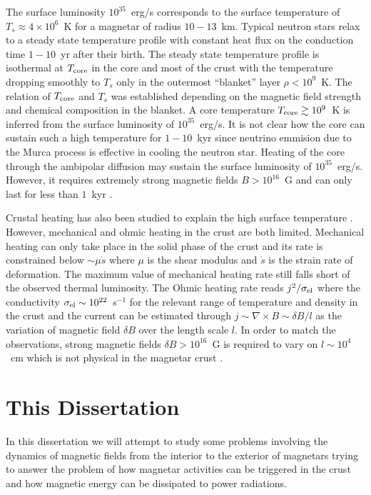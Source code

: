 The surface luminosity $10^{35}$~erg/s corresponds to the surface temperature of $T_s\approx 4\times 10^6$~K for a magnetar of radius $10-13$~km.
Typical neutron stars relax to a steady state temperature profile with constant heat flux on the conduction time $1-10$~yr after their birth.
The steady state temperature profile is isothermal at $T_{\rm core}$ in the core and most of the crust with the temperature dropping smoothly to $T_s$ only in the outermost ``blanket'' layer $\rho<10^9$~K.
The relation of $T_{\rm core}$ and $T_s$ was established \citep{2003ApJ...594..404P} depending on the magnetic field strength and chemical composition in the blanket.
A core temperature $T_{\rm core}\gtrsim 10^9$~K is inferred from the surface luminosity of $10^{35}$~erg/s.
It is not clear how the core can sustain such a high temperature for $1-10$~kyr since neutrino emmision due to the Murca process is effective in cooling the neutron star.
Heating of the core through the ambipolar diffusion may sustain the surface luminosity of $10^{35}$~erg/s. However, it requires extremely strong magnetic fields $B>10^{16}$~G and can only last for less than $1$~kyr \citep{2016ApJ...833..261B}.

Crustal heating has also been studied to explain the high surface temperature \citep{2014MNRAS.442.3484K}.
However, mechanical and ohmic heating in the crust are both limited.
Mechanical heating can only take place in the solid phase of the crust and its rate is constrained below $\sim\mu\dot{s}$ where $\mu$ is the shear modulus and $\dot{s}$ is the strain rate of deformation.
The maximum value of mechanical heating rate still falls short of the observed thermal luminosity.
The Ohmic heating rate reads $j^2/\sigma_{\rm el}$ where the conductivity $\sigma_{\rm el}\sim 10^{22}$~s$^{-1}$ for the relevant range of temperature and density in the crust \citep{2015SSRv..191..239P} and the current can be estimated through $j\sim \nabla\times B\sim \delta B/l$ as the variation of magnetic field $\delta B$ over the length scale $l$.
In order to match the observations, strong magnetic fields $\delta B>10^{16}$~G is required to vary on $l\sim 10^{4}$~cm which is not physical in the magnetar crust \citep{2016ApJ...833..261B}.

\section{This Dissertation}
\label{sec:intro-outline}

In this dissertation we will attempt to study some problems involving the dynamics of magnetic fields from the interior to the exterior of magnetars trying to answer the problem of how magnetar activities can be triggered in the crust and how magnetic energy can be dissipated to power radiations.


